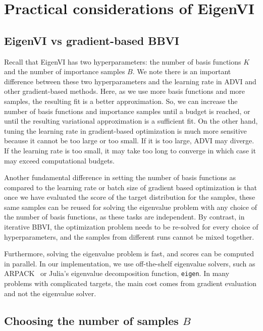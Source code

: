 
%

\section{Practical considerations of EigenVI}
\label{sec:discussion:eigenvi}


\subsection{EigenVI vs gradient-based BBVI}

Recall that EigenVI has two hyperparameters: the number of basis functions
$K$ and the number of importance samples $B$.
We note there is  an important difference between these two hyperparameters
and the learning rate in ADVI and other gradient-based methods.
Here, as we use more basis functions and more samples, the resulting fit
is a better approximation. So, we can increase the number of basis functions
and importance samples until a budget is reached, or until the resulting variational approximation is a sufficient fit.
On the other hand, tuning the learning rate in gradient-based optimization
is much more sensitive because it cannot be too large or too small. If it is too large, ADVI may diverge. If the learning rate is too small, it may take too long to converge in which case it may exceed computational budgets.

Another fundamental difference in setting the number of basis functions as compared to the
learning rate or batch size of gradient based optimization is that once we have evaluated the score of the target distribution for the samples, these same samples can be reused for solving the eigenvalue problem
with any choice of the number of basis functions, as these tasks are independent.
By contrast, in iterative BBVI, the optimization problem needs to be re-solved
for every choice of hyperparameters,
and the samples from different runs cannot be mixed together.
%

Furthermore, solving
the eigenvalue problem is fast, and scores can be computed in parallel.
In our implementation, we use off-the-shelf eigenvalue solvers, such as ARPACK~\cite{arpack1998} or
Julia's eigenvalue decomposition function, \texttt{eigen}.
In many problems with complicated targets, the main cost comes from gradient evaluation and not the eigenvalue solver.

\subsection{Choosing the number of samples $B$}

